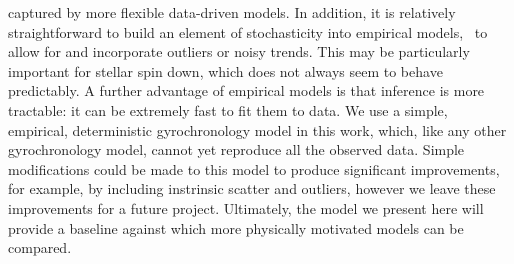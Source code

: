 captured by more flexible data-driven models.
In addition, it is relatively straightforward to build an element of
stochasticity into empirical models, \ie\ to allow for and incorporate
outliers or noisy trends.
This may be particularly important for stellar spin down, which does not
always seem to behave predictably.
A further advantage of empirical models is that inference is more tractable:
it can be extremely fast to fit them to data.
We use a simple, empirical, deterministic gyrochronology model in this work,
which, like any other gyrochronology model, cannot yet reproduce all the
observed data.
Simple modifications could be made to this model to produce
significant improvements, for example, by including instrinsic scatter and
outliers, however we leave these improvements for a future project.
Ultimately, the model we present here will provide a baseline against which
more physically motivated models can be compared.

